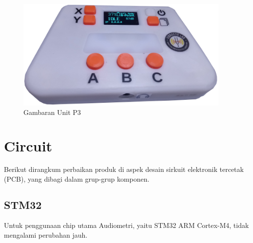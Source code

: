 \documentclass{book} %
\begin{document}
\begin{enumerate}
    	\begin{figure}[!ht]
    		\centering
    		\includegraphics[width=300pt]{images/p3}
    		\caption{Gambaran Unit P3}
    	\end{figure}
    \end{enumerate}
    
    \newpage
    \chapter{Circuit}
    
    Berikut dirangkum perbaikan produk di aspek desain sirkuit elektronik 
    tercetak (PCB), yang dibagi dalam grup-grup komponen.
    
    \section{STM32}
    
    Untuk penggunaan chip utama Audiometri, yaitu STM32 ARM Cortex-M4, tidak 
    mengalami perubahan jauh.
    
\end{document}
